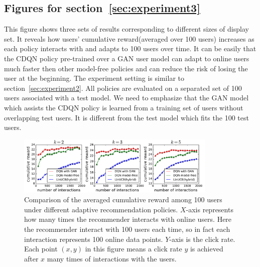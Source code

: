 \documentclass{article} %
\begin{document}
\subsection{Figures for section~\ref{sec:experiment3}}\label{app:exp_policy3}
This figure shows three sets of results corresponding to different sizes of display set. It reveals how users' cumulative reward(averaged over 100 users) increases as each policy interacts with and adapts to 100 users over time. It can be easily that the CDQN policy pre-trained over a GAN user model can adapt to online users much faster then other model-free policies and can reduce the risk of losing the user at the beginning. The experiment setting is similar to section~\ref{sec:experiment2}. All policies are evaluated on a separated set of 100 users associated with a test model. We need to emphasize that the GAN model which assists the CDQN policy is learned from a training set of users without overlapping test users. It is different from the test model which fits the 100 test users. 
\begin{figure}[htbp]
    \centering
    \includegraphics[width=0.85\textwidth]{Figs/policy_compare3_rwd.pdf}
\caption{\small Comparison of the averaged cumulative reward among 100 users under different adaptive recommendation policies. $X$-axis represents how many times the recommender interacts with online users. Here the recommender interact with 100 users each time, so in fact each interaction represents 100 online data points. $Y$-axis is the click rate. Each point $(x,y)$ in this figure means a click rate $y$ is achieved after $x$ many times of interactions with the users. }
\end{figure}
\end{document}
